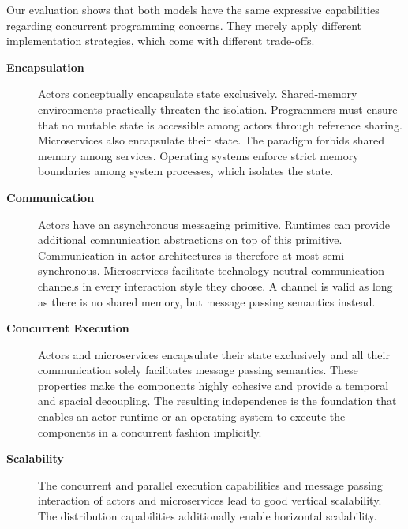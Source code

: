 \documentclass[final,hyperref={pdfpagelabels=true}]{beamer}
\begin{document}
\begin{frame}
\begin{columns}[t]
\begin{column}{.45\textwidth}
{        Our evaluation shows that both models have the same expressive capabilities regarding concurrent programming concerns. They merely apply different implementation strategies, which come with different trade-offs.

        \vspace*{\baselineskip}

        \begin{description}
          \item[\textbf{\textsf{Encapsulation}}] Actors conceptually encapsulate state exclusively. Shared-memory environments practically threaten the isolation. Programmers must ensure that no mutable state is accessible among actors through reference sharing. Microservices also encapsulate their state. The paradigm forbids shared memory among services. Operating systems enforce strict memory boundaries among system processes, which isolates the state.

          \vspace*{\baselineskip}

          \item[\textbf{\textsf{Communication}}] Actors have an asynchronous messaging primitive. Runtimes can provide additional comnunication abstractions on top of this primitive. Communication in actor architectures is therefore at most semi-synchronous. Microservices facilitate technology-neutral communication channels in every interaction style they choose. A channel is valid as long as there is no shared memory, but message passing semantics instead.

          \vspace*{\baselineskip}

          \item[\textbf{\textsf{Concurrent Execution}}] Actors and microservices encapsulate their state exclusively and all their communication solely facilitates message passing semantics. These properties make the components highly cohesive and provide a temporal and spacial decoupling. The resulting independence is the foundation that enables an actor runtime or an operating system to execute the components in a concurrent fashion implicitly.

          \vspace*{\baselineskip}

          \item[\textbf{\textsf{Scalability}}] The concurrent and parallel execution capabilities and message passing interaction of actors and microservices lead to good vertical scalability. The distribution capabilities additionally enable horizontal scalability.
        \end{description}
        
}
\end{column}
\end{columns}
\end{frame}
\end{document}
